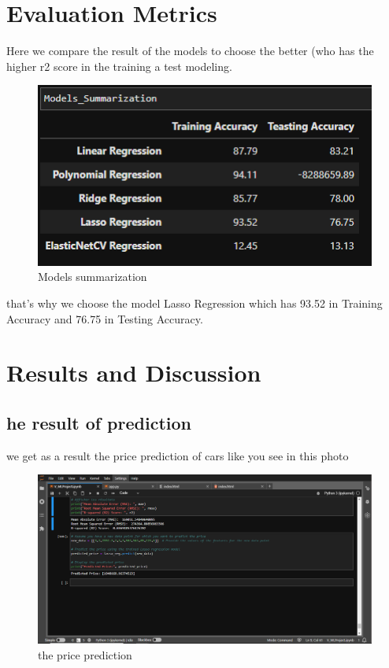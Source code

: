 \documentclass{article}
\begin{document}
\section{Evaluation Metrics}
Here we compare the result of the models to choose the better (who has the higher r2 score in the training a test modeling.

\begin{figure}[!h]
    \centering
    \includegraphics[width=1\textwidth]{comparison.png}
    \caption{Models summarization}
    \label{fig:my_label}
\end{figure}

 that's why we choose the model Lasso Regression which has 93.52 in Training Accuracy and 76.75 in Testing Accuracy. 

\section{Results and Discussion}
\subsection{he result of prediction}
we get as a result the price prediction of cars like you see in this photo \\
\begin{figure}[!h]
    \centering
    \includegraphics[width=1\textwidth]{result.png}
    \caption{the price prediction}
    \label{fig:my_label}
\end{figure}
\end{document}
